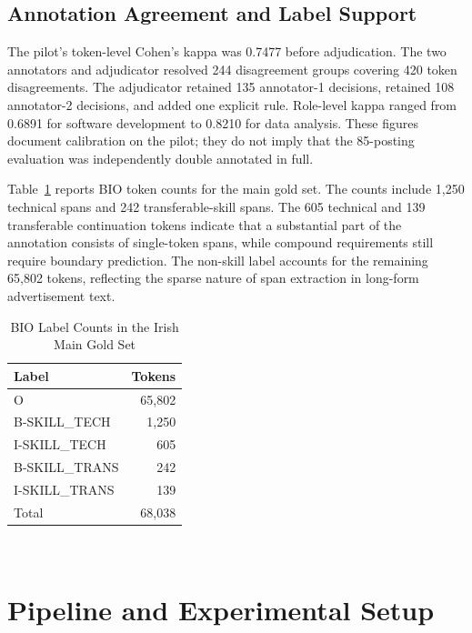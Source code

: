 \documentclass[conference]{IEEEtran}
\begin{document}
\subsection{Annotation Agreement and Label Support}
The pilot's token-level Cohen's kappa was 0.7477 before adjudication. The two annotators and adjudicator resolved 244 disagreement groups covering 420 token disagreements. The adjudicator retained 135 annotator-1 decisions, retained 108 annotator-2 decisions, and added one explicit rule. Role-level kappa ranged from 0.6891 for software development to 0.8210 for data analysis. These figures document calibration on the pilot; they do not imply that the 85-posting evaluation was independently double annotated in full.

Table~\ref{tab:labels} reports BIO token counts for the main gold set. The counts include 1,250 technical spans and 242 transferable-skill spans. The 605 technical and 139 transferable continuation tokens indicate that a substantial part of the annotation consists of single-token spans, while compound requirements still require boundary prediction. The non-skill label accounts for the remaining 65,802 tokens, reflecting the sparse nature of span extraction in long-form advertisement text.

\begin{table}[!t]
\caption{BIO Label Counts in the Irish Main Gold Set}
\label{tab:labels}
\centering
\small
\begin{tabular}{lr}
\toprule
Label & Tokens \\
\midrule
\textsf{O} & 65,802 \\
\textsf{B-SKILL\_TECH} & 1,250 \\
\textsf{I-SKILL\_TECH} & 605 \\
\textsf{B-SKILL\_TRANS} & 242 \\
\textsf{I-SKILL\_TRANS} & 139 \\
\midrule
Total & 68,038 \\
\bottomrule
\end{tabular}
\\[1mm]
\par{}
\end{table}

\section{Pipeline and Experimental Setup}
\end{document}

